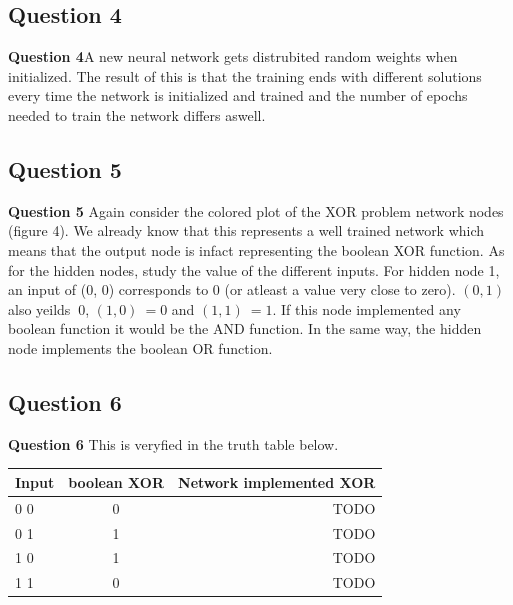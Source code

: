 \documentclass[a4paper]{article}
\begin{document}
\subsection*{Question 4}
\textbf{Question 4}A new neural network gets distrubited random weights 
when initialized. The result of this is that the training ends with different 
solutions every time the network is initialized and trained and the 
number of epochs needed to train the network differs aswell. 
\subsection*{Question 5}
\textbf{Question 5} Again consider the colored plot of the XOR problem 
network nodes (figure 4). We already 
know that this represents a well trained network which means that the output node is 
infact representing the boolean XOR function. As for the hidden nodes, study the value 
of the different inputs. For hidden node 1, an input of (0, 0) corresponds to 0 (or 
atleast a value very close to zero). $(0, 1)$ also yeilds $~ 0$, $(1, 0) ~= 0$ and 
$(1, 1) ~= 1$. If this node implemented any boolean function it would be the AND function.
In the same way, the hidden node implements the boolean OR function. 
\subsection*{Question 6}
\textbf{Question 6} This is veryfied in the truth table below. 

\begin{center}
    \begin{tabular} {l | c | r }
        Input & boolean XOR & Network implemented XOR \\
		\hline
        0 0 & 0 & TODO \\
        0 1 & 1 & TODO \\
        1 0 & 1 & TODO \\
        1 1 & 0 & TODO \\
    \end{tabular}
\end{center}
\end{document}
